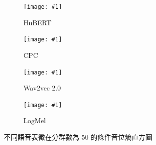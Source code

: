 {

\newcommand{\jeffheightt}[1]{\texttt{[image: \#1]}}

 \newcommand{\jjvfill}{\vfill}

\begin{figure}
     \centering
     \begin{subfigure}{\textwidth}  %
         \centering
         \jeffheightt{figures/histo-phngivenunitent-hubert50-cnt.png}
         \caption{HuBERT}
         \label{fig:ch3-heatmap-model--hubert-50-joint-byprob-hist}
     \end{subfigure}
     \jjvfill

     \begin{subfigure}{\textwidth}  %
         \centering
         \jeffheightt{figures/histo-phngivenunitent-cpc50-cnt.png}
         \caption{CPC}
         \label{fig:ch3-heatmap-model--cpc-50-joint-byprob-hist}
     \end{subfigure}



     \jjvfill

          \begin{subfigure}{\textwidth}  %
         \centering
         \jeffheightt{figures/histo-phngivenunitent-w2v2_50-cnt.png}
         \caption{Wav2vec 2.0}
         \label{fig:ch3-heatmap-model--w2v2-50-joint-byprob-hist}
     \end{subfigure}
     
     \jjvfill
     \begin{subfigure}{\textwidth}  %
         \centering
         \jeffheightt{figures/histo-phngivenunitent-logmel50-cnt.png}
         \caption{LogMel}
         \label{fig:ch3-heatmap-model--logmel-50-joint-byprob-hist}
     \end{subfigure}
     \caption{不同語音表徵在分群數為 50 的條件音位熵直方圖
     }
     \label{fig:hist-model}
\end{figure}

}  %


